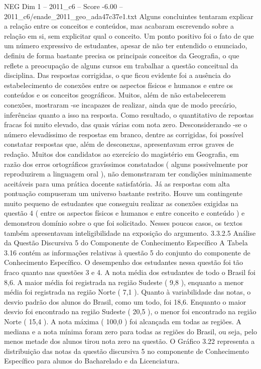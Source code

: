 \begin{textsample}{NEG Dim 1 – 2011\_c6 – Score -6.00 – 2011\_c6/enade\_2011\_geo\_ada47c37e1.txt}
Alguns concluintes tentaram explicar a relação entre os conceitos e conteúdos, mas acabaram escrevendo sobre a relação em si, sem explicitar qual o conceito.
Um ponto positivo foi o fato de que um número expressivo de estudantes, apesar de não ter entendido o enunciado, definiu de forma bastante precisa os principais conceitos da Geografia, o que reflete a preocupação de alguns cursos em trabalhar a questão conceitual da disciplina.
Das respostas corrigidas, o que ficou evidente foi a ausência do estabelecimento de conexões entre os aspectos físicos e humanos e entre os conteúdos e os conceitos geográficos.
Muitos, além de não estabelecerem conexões, mostraram -se incapazes de realizar, ainda que de modo precário, inferências quanto a isso na resposta.
Como resultado, o quantitativo de repostas fracas foi muito elevado, das quais várias com nota zero.
Desconsiderando -se o número elevadíssimo de respostas em branco, dentre as corrigidas, foi possível constatar respostas que, além de desconexas, apresentavam erros graves de redação.
Muitos dos candidatos ao exercício do magistério em Geografia, em razão dos erros ortográficos gravíssimos constatados ( alguns possivelmente por reproduzirem a linguagem oral ), não demonstraram ter condições minimamente aceitáveis para uma prática docente satisfatória.
Já as respostas com alta pontuação compuseram um universo bastante restrito.
Houve um contingente muito pequeno de estudantes que conseguiu realizar as conexões exigidas na questão 4 ( entre os aspectos físicos e humanos e entre conceito e conteúdo ) e demonstrou domínio sobre o que foi solicitado.
Nesses poucos casos, os textos também apresentavam inteligibilidade na exposição do argumento. 3.3.2.5 Análise da Questão Discursiva 5 do Componente de Conhecimento Específico A Tabela 3.16 contém as informações relativas à questão 5 do conjunto do componente de Conhecimento Específico.
O desempenho dos estudantes nessa questão foi tão fraco quanto nas questões 3 e 4.
A nota média dos estudantes de todo o Brasil foi 8,6.
A maior média foi registrada na região Sudeste ( 9,8 ), enquanto a menor média foi registrada na região Norte ( 7,1 ).
Quanto à variabilidade das notas, o desvio padrão dos alunos do Brasil, como um todo, foi 18,6.
Enquanto o maior desvio foi encontrado na região Sudeste ( 20,5 ), o menor foi encontrado na região Norte ( 15,4 ).
A nota máxima ( 100,0 ) foi alcançada em todas as regiões.
A mediana e a nota mínima foram zero para todas as regiões do Brasil, ou seja, pelo menos metade dos alunos tirou nota zero na questão.
O Gráfico 3.22 representa a distribuição das notas da questão discursiva 5 no componente de Conhecimento Específico para alunos do Bacharelado e da Licenciatura.

\end{textsample}
